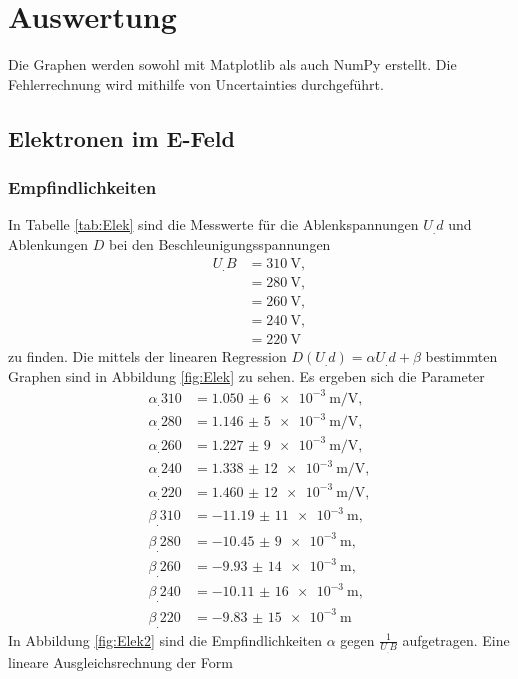 \section{Auswertung}
\label{sec:Auswertung}


Die Graphen werden sowohl mit Matplotlib \cite{matplotlib} als auch NumPy \cite{numpy} erstellt. Die Fehlerrechnung wird mithilfe von Uncertainties \cite{uncertainties} durchgeführt.

\subsection{Elektronen im E-Feld}
\subsubsection{Empfindlichkeiten}
\label{sec:empf}
In Tabelle \ref{tab:Elek} sind die Messwerte für die Ablenkspannungen $U_.d$ und Ablenkungen $D$ bei den Beschleunigungsspannungen
\begin{align*}
U_.B&=\SI{310}{\volt},\\
&=\SI{280}{\volt},\\
&=\SI{260}{\volt},\\
&=\SI{240}{\volt},\\
&=\SI{220}{\volt}
\end{align*}
zu finden. Die mittels der linearen Regression $D(U_.d)=\alpha U_.d + \beta$ bestimmten Graphen sind in Abbildung \ref{fig:Elek} zu sehen.
Es ergeben sich die Parameter
\begin{align*}
\alpha_.{310}&=\SI{1,050(6)e-3}{\metre\per\volt},\\
\alpha_.{280}&=\SI{1,146(5)e-3}{\metre\per\volt},\\
\alpha_.{260}&=\SI{1,227(9)e-3}{\metre\per\volt},\\
\alpha_.{240}&=\SI{1,338(12)e-3}{\metre\per\volt},\\
\alpha_.{220}&=\SI{1,460(12)e-3}{\metre\per\volt},\\
\beta_.{310}&=\SI{-11,19(11)e-3}{\metre},\\
\beta_.{280}&=\SI{-10,45(9)e-3}{\metre},\\
\beta_.{260}&=\SI{-9,93(14)e-3}{\metre},\\
\beta_.{240}&=\SI{-10,11(16)e-3}{\metre},\\
\beta_.{220}&=\SI{-9,83(15)e-3}{\metre}
\end{align*}
In Abbildung \ref{fig:Elek2} sind die Empfindlichkeiten $\alpha$ gegen $\frac{1}{U_.B}$ aufgetragen.
Eine lineare Ausgleichsrechnung der Form
